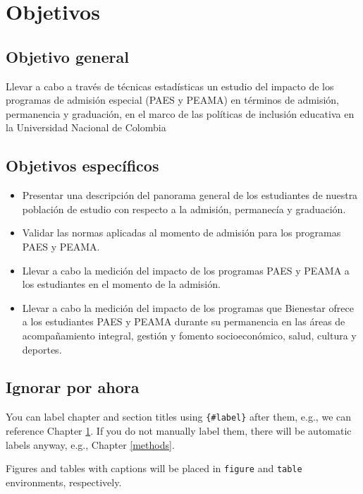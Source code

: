 \documentclass[]{article}
\title{}
\author{}
\date{}
\providecommand{\tightlist}{%
  \setlength{\itemsep}{0pt}\setlength{\parskip}{0pt}}
\theoremstyle{definition}
\theoremstyle{definition}
\theoremstyle{definition}
\theoremstyle{remark}
\begin{document}
{
\setcounter{tocdepth}{2}
\tableofcontents
}
\section{Objetivos}\label{obj}

\subsection{Objetivo general}\label{objetivo-general}

Llevar a cabo a través de técnicas estadísticas un estudio del impacto
de los programas de admisión especial (PAES y PEAMA) en términos de
admisión, permanencia y graduación, en el marco de las políticas de
inclusión educativa en la Universidad Nacional de Colombia

\subsection{Objetivos específicos}\label{objetivos-especificos}

\begin{itemize}
\tightlist
\item
  Presentar una descripción del panorama general de los estudiantes de
  nuestra población de estudio con respecto a la admisión, permanecía y
  graduación.
\item
  Validar las normas aplicadas al momento de admisión para los programas
  PAES y PEAMA.
\item
  Llevar a cabo la medición del impacto de los programas PAES y PEAMA a
  los estudiantes en el momento de la admisión.
\item
  Llevar a cabo la medición del impacto de los programas que Bienestar
  ofrece a los estudiantes PAES y PEAMA durante su permanencia en las
  áreas de acompañamiento integral, gestión y fomento socioeconómico,
  salud, cultura y deportes.
\end{itemize}

\subsection{Ignorar por ahora}\label{ignorar-por-ahora}

You can label chapter and section titles using \texttt{\{\#label\}}
after them, e.g., we can reference Chapter \ref{obj}. If you do not
manually label them, there will be automatic labels anyway, e.g.,
Chapter \ref{methods}.

Figures and tables with captions will be placed in \texttt{figure} and
\texttt{table} environments, respectively.
\end{document}
